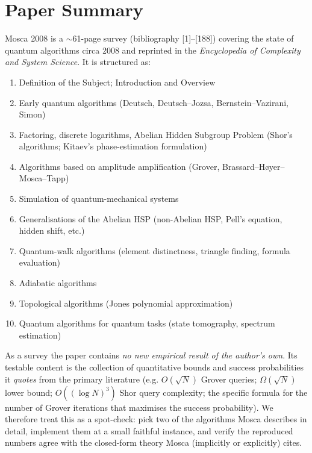 \documentclass[11pt]{article}
\begin{document}
\section{Paper Summary}
Mosca 2008 is a $\sim$61-page survey (bibliography [1]--[188]) covering the state of quantum algorithms circa 2008 and reprinted in the \emph{Encyclopedia of Complexity and System Science}. It is structured as:
\begin{enumerate}\itemsep=0pt
  \item Definition of the Subject; Introduction and Overview
  \item Early quantum algorithms (Deutsch, Deutsch--Jozsa, Bernstein--Vazirani, Simon)
  \item Factoring, discrete logarithms, Abelian Hidden Subgroup Problem (Shor's algorithms; Kitaev's phase-estimation formulation)
  \item Algorithms based on amplitude amplification (Grover, Brassard--H\o yer--Mosca--Tapp)
  \item Simulation of quantum-mechanical systems
  \item Generalisations of the Abelian HSP (non-Abelian HSP, Pell's equation, hidden shift, etc.)
  \item Quantum-walk algorithms (element distinctness, triangle finding, formula evaluation)
  \item Adiabatic algorithms
  \item Topological algorithms (Jones polynomial approximation)
  \item Quantum algorithms for quantum tasks (state tomography, spectrum estimation)
\end{enumerate}
As a survey the paper contains \emph{no new empirical result of the author's own}. Its testable content is the collection of quantitative bounds and success probabilities it \emph{quotes} from the primary literature (e.g. $O(\sqrt{N})$ Grover queries; $\Omega(\sqrt{N})$ lower bound; $O((\log N)^3)$ Shor query complexity; the specific formula for the number of Grover iterations that maximises the success probability). We therefore treat this as a spot-check: pick two of the algorithms Mosca describes in detail, implement them at a small faithful instance, and verify the reproduced numbers agree with the closed-form theory Mosca (implicitly or explicitly) cites.
\end{document}
